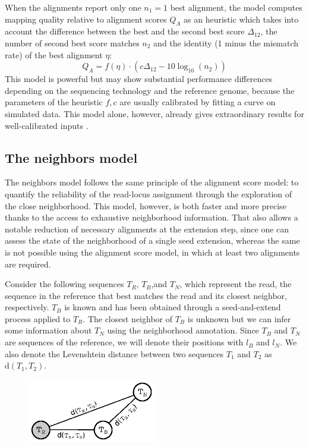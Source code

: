 When the alignments report only one $n_1=1$ best alignment, the model
computes mapping quality relative to alignment scores $Q_A$ as an
heuristic which takes into account the difference between the best and
the second best score $\Delta_{12}$, the number of second best score
matches $n_2$ and the identity (1 minus the mismatch rate) of the best
alignment $\eta$: 
\begin{equation}
  Q_A = \mathit{f}(\eta)\cdot\left(c\Delta_{12}-10\log_{10}(n_2)\right)
\end{equation}
This model is powerful but may show substantial performance
differences depending on the sequencing technology and the reference
genome, because the parameters of the heuristic $\mathit{f}, c$ are
usually calibrated by fitting a curve on simulated data. This
model alone, however, already gives extraordinary results for
well-calibrated inputs \cite{bwa}.

\subsection{The neighbors model}
The neighbors model follows the same principle of the alignment score
model: to quantify the reliability of the read-locus assignment
through the exploration of the close neighborhood. This model,
however, is both faster and more precise thanks to the access to
exhaustive neighborhood information. That also allows a notable
reduction of necessary alignments at the extension step, since one can
assess the state of the neighborhood of a single seed extension,
whereas the same is not possible using the alignment score model, in
which at least two alignments are required.

Consider the following sequences $T_R$, $T_B$,and $T_N$, which
represent the read, the sequence in the reference that best matches
the read and its closest neighbor, respectively. $T_B$ is known and
has been obtained through a seed-and-extend process applied to
$T_R$. The closest neighbor of $T_B$ is unknown but we can infer some
information about $T_N$ using the neighborhood annotation. Since $T_B$
and $T_N$ are sequences of the reference, we will denote their
positions with $l_B$ and $l_N$. We also denote the Levenshtein
distance between two sequences $T_1$ and $T_2$ as
$\mathrm{d}(T_1,T_2)$.  

\begin{figure}[h]
	\begin{minipage}[b]{\linewidth}
	  \centering
	  \includegraphics[width=0.5\textwidth]{figures/chap3_neighmodel_neighborhood}
	  \caption{}
	  \label{fig:chap3:modelneighborhood}
   \end{minipage}
\end{figure}

